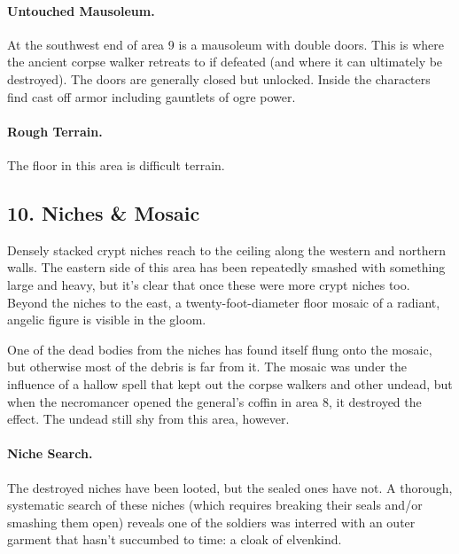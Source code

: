 \documentclass[10pt,a4paper,twoside,twocolumn,openany,bg=print,nodeprecatedcode]{dndbook}
\begin{document}
\paragraph{Untouched Mausoleum.}
At the southwest end of area 9 is a mausoleum with double doors. This is where the ancient corpse walker retreats to if defeated (and where it can ultimately be destroyed). The doors are generally closed but unlocked. Inside the characters find cast off armor including gauntlets of ogre power.
\paragraph{Rough Terrain.}
The floor in this area is difficult terrain.
\subsection{10. Niches \& Mosaic}
\begin{DndReadAloud}{}
Densely stacked crypt niches reach to the ceiling along the western and northern walls. The eastern side of this area has been repeatedly smashed with something large and heavy, but it's clear that once these were more crypt niches too. Beyond the niches to the east, a twenty-foot-diameter floor mosaic of a radiant, angelic figure is visible in the gloom.
\end{DndReadAloud}

One of the dead bodies from the niches has found itself flung onto the mosaic, but otherwise most of the debris is far from it. The mosaic was under the influence of a hallow spell that kept out the corpse walkers and other undead, but when the necromancer opened the general's coffin in area 8, it destroyed the effect. The undead still shy from this area, however.
\paragraph{Niche Search.}
The destroyed niches have been looted, but the sealed ones have not. A thorough, systematic search of these niches (which requires breaking their seals and/or smashing them open) reveals one of the soldiers was interred with an outer garment that hasn't succumbed to time: a cloak of elvenkind.
\end{document}
